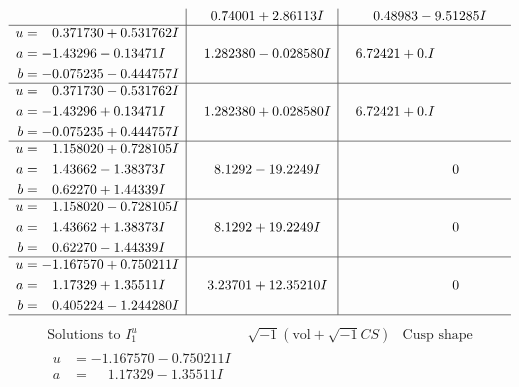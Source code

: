 \documentclass[1p]{elsarticle_modified}
\theoremstyle{definition}
\newcommand{\I}{\sqrt{-1}}
\begin{document}
$$\begin{array}{c|c|c}
 & \phantom{-}0.74001 + 2.86113 I & \phantom{-}0.48983 - 9.51285 I \\ \hline\begin{aligned}
u &= \phantom{-}0.371730 + 0.531762 I \\
a &= -1.43296 - 0.13471 I \\
b &= -0.075235 - 0.444757 I\end{aligned}
 & \phantom{-}1.282380 - 0.028580 I & \phantom{-}6.72421 + 0. I\phantom{ +0.000000I} \\ \hline\begin{aligned}
u &= \phantom{-}0.371730 - 0.531762 I \\
a &= -1.43296 + 0.13471 I \\
b &= -0.075235 + 0.444757 I\end{aligned}
 & \phantom{-}1.282380 + 0.028580 I & \phantom{-}6.72421 + 0. I\phantom{ +0.000000I} \\ \hline\begin{aligned}
u &= \phantom{-}1.158020 + 0.728105 I \\
a &= \phantom{-}1.43662 - 1.38373 I \\
b &= \phantom{-}0.62270 + 1.44339 I\end{aligned}
 & \phantom{-}8.1292 - 19.2249 I & \phantom{-0.000000 } 0 \\ \hline\begin{aligned}
u &= \phantom{-}1.158020 - 0.728105 I \\
a &= \phantom{-}1.43662 + 1.38373 I \\
b &= \phantom{-}0.62270 - 1.44339 I\end{aligned}
 & \phantom{-}8.1292 + 19.2249 I & \phantom{-0.000000 } 0 \\ \hline\begin{aligned}
u &= -1.167570 + 0.750211 I \\
a &= \phantom{-}1.17329 + 1.35511 I \\
b &= \phantom{-}0.405224 - 1.244280 I\end{aligned}
 & \phantom{-}3.23701 + 12.35210 I & \phantom{-0.000000 } 0\\
 \hline 
 \end{array}$$\newpage$$\begin{array}{c|c|c}  
\text{Solutions to }I^u_{1}& \I (\text{vol} + \sqrt{-1}CS) & \text{Cusp shape}\\
 \hline 
\begin{aligned}
u &= -1.167570 - 0.750211 I \\
a &= \phantom{-}1.17329 - 1.35511 I \\

\end{aligned}
\end{array}$$
\end{document}
